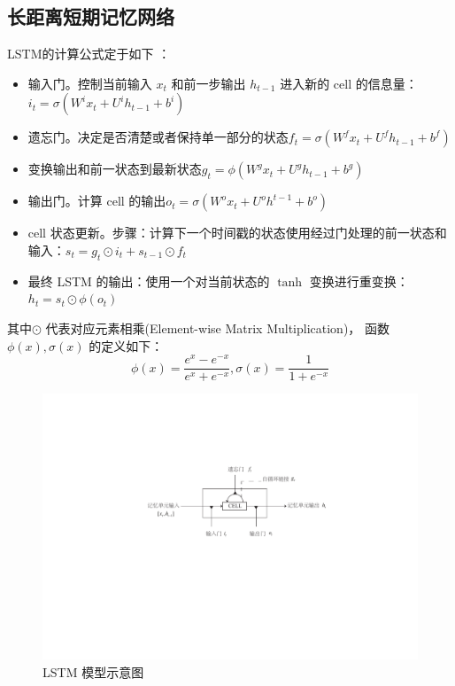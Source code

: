 \subsection{长距离短期记忆网络}
 LSTM的计算公式定于如下 ：
\begin{itemize}
\item 输入门。控制当前输入 $x_t$ 和前一步输出 $h_{t−1}$ 进入新的 cell 的信息量：$i_t=\sigma(W^i x_t+U^i h_{t-1}+b^i)$
\item  遗忘门。决定是否清楚或者保持单一部分的状态$f_t=\sigma(W^f x_t+U^f h_{t-1}+b^f)$
\item  变换输出和前一状态到最新状态$g_t=\phi(W^g x_t+U^g h_{t-1}+b^g)$
\item  输出门。计算 cell 的输出$o_t=\sigma(W^o x_t+U^o h^{t-1}+b^o)$
\item  cell 状态更新。步骤：计算下一个时间戳的状态使用经过门处理的前一状态和输入：$s_t=g_t\odot i_t+s_{t-1}\odot f_t$
\item 最终 LSTM 的输出：使用一个对当前状态的 $\tanh$ 变换进行重变换：$h_t=s_t\odot \phi(o_t)$
\end{itemize}
\noindent 其中$\odot$ 代表对应元素相乘(Element-wise Matrix Multiplication)， 函数 $\phi(x), \sigma(x)$ 的定义如下：
\begin{equation}\label{equ:tanh}
  \phi(x)=\frac{e^x-e^{-x}}{e^x+e^{-x}},\sigma(x)=\frac{1}{1+e^{-x}}
\end{equation}

\begin{figure}
  \centering
  \includegraphics[width=0.7\linewidth]{./figures/lstm.pdf}
  \caption{LSTM 模型示意图}\label{fig:lstm}
\end{figure}

